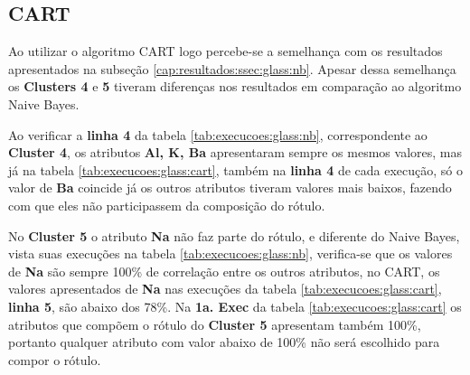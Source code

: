 \subsection{CART} \label{cap:resultados:ssec:glass:cart}

Ao utilizar o algoritmo CART logo percebe-se a semelhança com os resultados apresentados na subseção \ref{cap:resultados:ssec:glass:nb}. Apesar dessa semelhança os \textbf{Clusters 4} e \textbf{5} tiveram diferenças nos resultados em comparação ao algoritmo Naive Bayes. 

Ao verificar a \textbf{linha 4} da tabela \ref{tab:execucoes:glass:nb}, correspondente ao \textbf{Cluster 4}, os atributos \textbf{Al, K, Ba} apresentaram sempre os mesmos valores, mas já na tabela \ref{tab:execucoes:glass:cart}, também na \textbf{linha 4} de cada execução, só o valor de \textbf{Ba} coincide já os outros atributos tiveram valores mais baixos, fazendo com que eles não participassem da composição do rótulo.

No \textbf{Cluster 5} o atributo \textbf{Na} não faz parte do rótulo, e diferente do Naive Bayes, vista suas execuções na tabela \ref{tab:execucoes:glass:nb}, verifica-se que os valores de \textbf{Na} são sempre 100\% de correlação entre os outros atributos, no CART, os valores apresentados de \textbf{Na}  nas execuções da tabela \ref{tab:execucoes:glass:cart}, \textbf{linha 5}, são abaixo dos 78\%. Na \textbf{1a. Exec} da tabela \ref{tab:execucoes:glass:cart} os atributos que compõem o rótulo do \textbf{Cluster 5} apresentam também 100\%, portanto qualquer atributo com valor abaixo de 100\%  não será escolhido para compor o rótulo.

